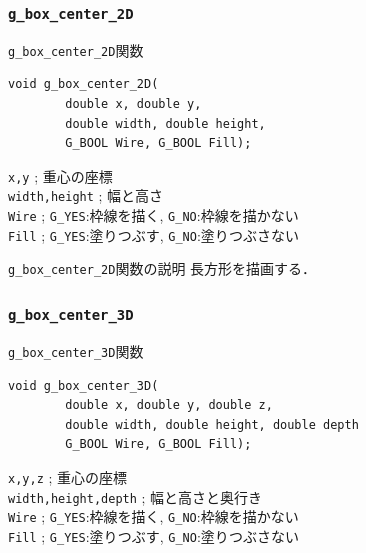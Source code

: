 \documentclass[platex,a4paper,12pt]{jsarticle}%
\begin{document}
\subsubsection{\texttt{g\_box\_center\_2D}}

\begin{itembox}[l]{\texttt{g\_box\_center\_2D}関数}
\begin{verbatim}
void g_box_center_2D(
        double x, double y,
        double width, double height,
        G_BOOL Wire, G_BOOL Fill);    
\end{verbatim}
\verb|x,y| ; 重心の座標\\
\verb|width,height| ; 幅と高さ\\
\verb|Wire| ; \verb|G_YES|:枠線を描く, \verb|G_NO|:枠線を描かない \\
\verb|Fill| ; \verb|G_YES|:塗りつぶす, \verb|G_NO|:塗りつぶさない
\end{itembox}

\begin{itembox}[l]{\texttt{g\_box\_center\_2D}関数の説明}
長方形を描画する．
\end{itembox}


\subsubsection{\texttt{g\_box\_center\_3D}}

\begin{itembox}[l]{\texttt{g\_box\_center\_3D}関数}
\begin{verbatim}
void g_box_center_3D(
        double x, double y, double z,
        double width, double height, double depth
        G_BOOL Wire, G_BOOL Fill);   
\end{verbatim}
\verb|x,y,z| ; 重心の座標\\
\verb|width,height,depth| ; 幅と高さと奥行き\\
\verb|Wire| ; \verb|G_YES|:枠線を描く, \verb|G_NO|:枠線を描かない \\
\verb|Fill| ; \verb|G_YES|:塗りつぶす, \verb|G_NO|:塗りつぶさない
\end{itembox}
\end{document}

